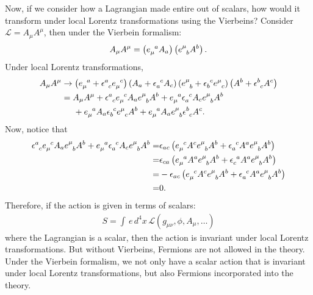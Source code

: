\documentclass{book}
\numberwithin{equation}{section}
\theoremstyle{definition}
\newcommand{\lag}{\mathcal{L}}
\newcommand{\nn}{\nonumber}
\newcommand{\lp}{\left(}
\newcommand{\rp}{\right)}
\begin{document}
Now, if we consider how a Lagrangian made entire out of scalars, how would it transform under local Lorentz transformations using the Vierbeins? Consider $\lag = A_\mu A^\mu $, then under the Vierbein formalism:
\begin{align}
A_\mu A^\mu = \lp\tensor{e}{_\mu^a }A_a \rp\lp \tensor{e}{^\mu_b}A^b \rp.
\end{align}
Under local Lorentz transformations,
\begin{align}
A_\mu A^\mu &\to 
\lp \tensor{e}{_\mu^a} + \tensor{\epsilon}{^a_c}\tensor{e}{_\mu^c} \rp
\lp A_a + \tensor{\epsilon}{_a^c}A_c \rp
\lp \tensor{e}{^\mu_b} + \tensor{\epsilon}{_b^c}\tensor{e}{^\mu_c} \rp
\lp A^b + \tensor{\epsilon}{^b_c}A^c \rp
\nn\\
&= 
A_\mu A^\mu + \tensor{\epsilon}{^a_c}\tensor{e}{_\mu^c}A_a\tensor{e}{^\mu_b}A^b 
+ \tensor{e}{_\mu^a}\tensor{\epsilon}{_a^c}A_c\tensor{e}{^\mu_b}A^b \nn\\
&\hspace{0.5cm}
+ \tensor{e}{_\mu^a}A_a\tensor{\epsilon}{_b^c}\tensor{e}{^\mu_c}A^b 
+  \tensor{e}{_\mu^a} A_a\tensor{e}{^\mu_b}\tensor{\epsilon}{^b_c}A^c.
\end{align}
Now, notice that
\begin{align}
\tensor{\epsilon}{^a_c}\tensor{e}{_\mu^c}A_a\tensor{e}{^\mu_b}A^b 
+ \tensor{e}{_\mu^a}\tensor{\epsilon}{_a^c}A_c\tensor{e}{^\mu_b}A^b 
=& \epsilon_{ac}\lp \tensor{e}{_\mu^c}A^c\tensor{e}{^\mu_b}A^b + \tensor{\epsilon}{_a^c}A^a\tensor{e}{^\mu_b}A^b \rp\\
=& \epsilon_{ca}\lp \tensor{e}{_\mu^a}A^a\tensor{e}{^\mu_b}A^b + \tensor{\epsilon}{_c^a}A^a\tensor{e}{^\mu_b}A^b \rp\\
=& -\epsilon_{ac}\lp \tensor{e}{_\mu^c}A^c\tensor{e}{^\mu_b}A^b + \tensor{\epsilon}{_a^c}A^a\tensor{e}{^\mu_b}A^b \rp\\
=& 0.
\end{align}
Therefore, if the action is given in terms of scalars:
\begin{align}
S = \int\,e\,d^4x\,\lag(g_{\mu\nu}, \phi, A_\mu,\dots)
\end{align}
where the Lagrangian is a scalar, then the action is invariant under local Lorentz transformations. But without Vierbeins, Fermions are not allowed in the theory. Under the Vierbein formalism, we not only have a scalar action that is invariant under local Lorentz transformations, but also Fermions incorporated into the theory. \\
\end{document}
